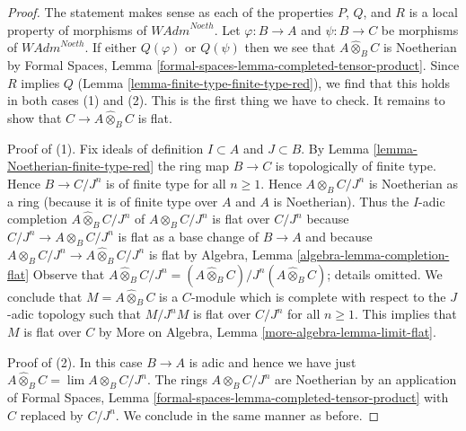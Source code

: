 \documentclass[10pt,a4paper]{amsart}
\theoremstyle{plain}
\theoremstyle{definition}
\theoremstyle{remark}
\numberwithin{equation}{subsection}
\def\lim{\mathop{\mathrm{lim}}\nolimits}
\begin{document}
\begin{proof}
The statement makes sense as each of the properties $P$, $Q$, and $R$
is a local property of morphisms of $\textit{WAdm}^{Noeth}$.
Let $\varphi : B \to A$ and $\psi : B \to C$ be morphisms of
$\textit{WAdm}^{Noeth}$. If either $Q(\varphi)$ or $Q(\psi)$
then we see that $A \widehat{\otimes}_B C$ is Noetherian by
Formal Spaces, Lemma \ref{formal-spaces-lemma-completed-tensor-product}.
Since $R$ implies $Q$ (Lemma \ref{lemma-finite-type-finite-type-red}),
we find that this holds in both cases (1) and (2).
This is the first thing we have to check. It remains to show
that $C \to A \widehat{\otimes}_B C$ is flat.

\medskip\noindent
Proof of (1). Fix ideals of definition $I \subset A$ and $J \subset B$.
By Lemma \ref{lemma-Noetherian-finite-type-red} the ring map
$B \to C$ is topologically of finite type. Hence
$B \to C/J^n$ is of finite type for all $n \geq 1$.
Hence $A \otimes_B C/J^n$ is Noetherian as a ring
(because it is of finite type over $A$ and $A$ is Noetherian).
Thus the $I$-adic completion $A \widehat{\otimes}_B C/J^n$
of $A \otimes_B C/J^n$ is flat over $C/J^n$ because
$C/J^n \to A \otimes_B C/J^n$ is flat as a base change of
$B \to A$ and because
$A \otimes_B C/J^n \to A \widehat{\otimes}_B C/J^n$ is flat by
Algebra, Lemma \ref{algebra-lemma-completion-flat}
Observe that $A \widehat{\otimes}_B C/J^n =
(A \widehat{\otimes}_B C)/J^n(A \widehat{\otimes}_B C)$; details omitted.
We conclude that $M = A \widehat{\otimes}_B C$ is a $C$-module
which is complete with respect to the $J$-adic topology
such that $M/J^nM$ is flat over $C/J^n$ for all $n \geq 1$.
This implies that $M$ is flat over $C$ by
More on Algebra, Lemma \ref{more-algebra-lemma-limit-flat}.

\medskip\noindent
Proof of (2). In this case $B \to A$ is adic and hence we have just
$A \widehat{\otimes}_B C = \lim A \otimes_B C/J^n$.
The rings $A \otimes_B C/J^n$ are Noetherian by an application of 
Formal Spaces, Lemma \ref{formal-spaces-lemma-completed-tensor-product}
with $C$ replaced by $C/J^n$.
We conclude in the same manner as before.
\end{proof}
\end{document}

